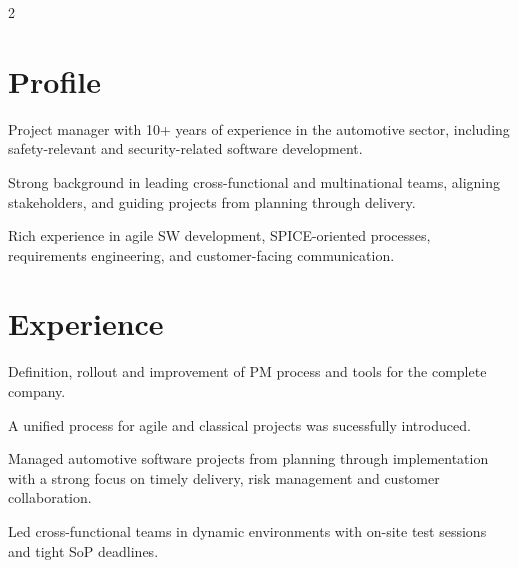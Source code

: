 {}

\begin{paracol}{2}

\switchcolumn[0]


\section{Profile}
\begin{tightemize}
\item Project manager with 10+ years of experience in the automotive sector, including safety-relevant and security-related software development.
\item Strong background in leading cross-functional and multinational teams, aligning stakeholders, and guiding projects from planning through delivery.
\item Rich experience in agile SW development, SPICE-oriented processes, requirements engineering, and customer-facing communication.
\end{tightemize}
\sectionsep


\section{Experience}
\begin{tightemize}
\item Definition, rollout and improvement of PM process and tools for the complete company.
\item A unified process for agile and classical projects was sucessfully introduced.
\end{tightemize}
\sectionsep

\begin{tightemize}
\item Managed automotive software projects from planning through implementation with a strong focus on timely delivery, risk management and customer collaboration.
\item Led cross-functional teams in dynamic environments with on-site test sessions and tight SoP deadlines.
\end{tightemize}
\sectionsep


\end{paracol}
